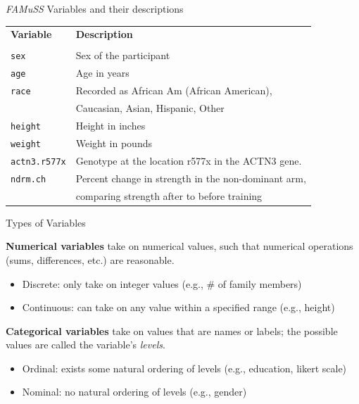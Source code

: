 \documentclass[10pt]{beamer}\usepackage[]{graphicx}\usepackage[]{color}
\begin{document}
\begin{frame}{\emph{FAMuSS} Variables and their descriptions}
	\protect\hypertarget{famuss-variables-and-their-descriptions}{}
	
	\begin{center}
		\begin{tabular}{ll}
			{\bf Variable} & {\bf Description} \\
			& \\
			\texttt{sex} & Sex of the participant \\
			\texttt{age} & Age in years   \\
			\texttt{race} & Recorded as African Am (African American),\\
			& Caucasian, Asian, Hispanic, Other \\
			\texttt{height} & Height in inches    \\
			\texttt{weight} & Weight in pounds  \\
			\texttt{actn3.r577x} & Genotype at the location r577x in the ACTN3 gene. \\
			\texttt{ndrm.ch} & Percent change in strength in the non-dominant arm, \\
			& comparing strength after to before training \\
		\end{tabular}
	\end{center}
	
\end{frame}

\begin{frame}{Types of Variables}
	\protect\hypertarget{types-of-variables}{}
	
	\textbf{Numerical variables} take on numerical values, such that
	numerical operations (sums, differences, etc.) are reasonable.
	
	\begin{itemize}
		\item
		Discrete: only take on integer values (e.g., \# of family members)
		\item
		Continuous: can take on any value within a specified range (e.g.,
		height)
	\end{itemize}
	
	\pause
	
	\textbf{Categorical variables} take on values that are names or labels;
	the possible values are called the variable's \emph{levels}.
	
	\begin{itemize}
		\tightlist
		\item
		Ordinal: exists some natural ordering of levels (e.g., education, likert scale)
		\item
		Nominal: no natural ordering of levels (e.g., gender)
	\end{itemize}
	
\end{frame}
\end{document}
